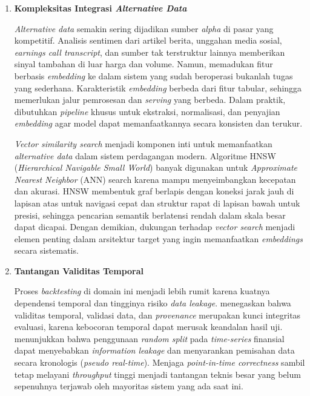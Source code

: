 \vspace{0.5em}
\begin{enumerate}
    \item \textbf{Kompleksitas Integrasi \textit{Alternative Data}}
    
    \textit{Alternative data} semakin sering dijadikan sumber \textit{alpha} di pasar yang kompetitif. Analisis sentimen dari artikel berita, unggahan media sosial, \textit{earnings call transcript}, dan sumber tak terstruktur lainnya memberikan sinyal tambahan di luar harga dan volume. Namun, memadukan fitur berbasis \textit{embedding} ke dalam sistem yang sudah beroperasi bukanlah tugas yang sederhana. Karakteristik \textit{embedding} berbeda dari fitur tabular, sehingga memerlukan jalur pemrosesan dan \textit{serving} yang berbeda. Dalam praktik, dibutuhkan \textit{pipeline} khusus untuk ekstraksi, normalisasi, dan penyajian \textit{embedding} agar model dapat memanfaatkannya secara konsisten dan terukur.

    \textit{Vector similarity search} menjadi komponen inti untuk memanfaatkan \textit{alternative data} dalam sistem perdagangan modern. Algoritme HNSW (\textit{Hierarchical Navigable Small World}) banyak digunakan untuk \textit{Approximate Nearest Neighbor} (ANN) search karena mampu menyeimbangkan kecepatan dan akurasi. HNSW membentuk graf berlapis dengan koneksi jarak jauh di lapisan atas untuk navigasi cepat dan struktur rapat di lapisan bawah untuk presisi, sehingga pencarian semantik berlatensi rendah dalam skala besar dapat dicapai. Dengan demikian, dukungan terhadap \textit{vector search} menjadi elemen penting dalam arsitektur target yang ingin memanfaatkan \textit{embeddings} secara sistematis.

    \vspace{0.5em}

    \item \textbf{Tantangan Validitas Temporal}
    
    Proses \textit{backtesting} di domain ini menjadi lebih rumit karena kuatnya dependensi temporal dan tingginya risiko \textit{data leakage}. \textcite{polyzotis2018data} menegaskan bahwa validitas temporal, validasi data, dan \textit{provenance} merupakan kunci integritas evaluasi, karena kebocoran temporal dapat merusak keandalan hasil uji. \textcite{wang2021leakage} menunjukkan bahwa penggunaan \textit{random split} pada \textit{time-series} finansial dapat menyebabkan \textit{information leakage} dan menyarankan pemisahan data secara kronologis (\textit{pseudo real-time}). Menjaga \textit{point-in-time correctness} sambil tetap melayani \textit{throughput} tinggi menjadi tantangan teknis besar yang belum sepenuhnya terjawab oleh mayoritas sistem yang ada saat ini.
\end{enumerate}

